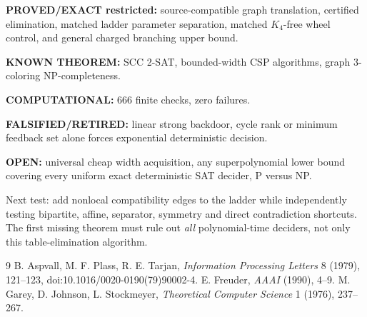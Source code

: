 \documentclass[11pt]{article}
\begin{document}
\noindent\textbf{PROVED/EXACT restricted:} source-compatible graph translation, certified elimination, matched ladder parameter separation, matched \(K_4\)-free wheel control, and general charged branching upper bound.\par
\noindent\textbf{KNOWN THEOREM:} SCC 2-SAT, bounded-width CSP algorithms, graph 3-coloring NP-completeness.\par
\noindent\textbf{COMPUTATIONAL:} 666 finite checks, zero failures.\par
\noindent\textbf{FALSIFIED/RETIRED:} linear strong backdoor, cycle rank or minimum feedback set alone forces exponential deterministic decision.\par
\noindent\textbf{OPEN:} universal cheap width acquisition, any superpolynomial lower bound covering every uniform exact deterministic SAT decider, P versus NP.\par

Next test: add nonlocal compatibility edges to the ladder while independently testing bipartite, affine, separator, symmetry and direct contradiction shortcuts. The first missing theorem must rule out \emph{all} polynomial-time deciders, not only this table-elimination algorithm.

\begin{thebibliography}{9}
 B. Aspvall, M. F. Plass, R. E. Tarjan, \emph{Information Processing Letters} 8 (1979), 121--123, doi:10.1016/0020-0190(79)90002-4.
 E. Freuder, \emph{AAAI} (1990), 4--9.
 M. Garey, D. Johnson, L. Stockmeyer, \emph{Theoretical Computer Science} 1 (1976), 237--267.
\end{thebibliography}
\end{document}
